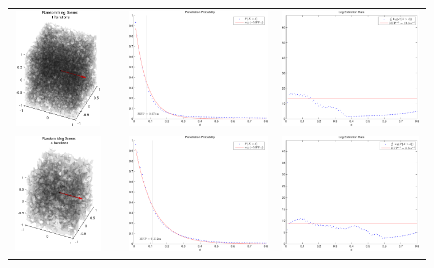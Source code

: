 \begin{figure}
\centering
\begin{tabular}{cccc}
\includegraphics[height=1.2in]{Penetration/ising_cell_001.png} &&
\includegraphics[height=1.2in]{Penetration/ising_penetration_001} &
\includegraphics[height=1.2in]{Penetration/ising_extinction_001}\\
\includegraphics[height=1.2in]{Penetration/ising_cell_004.png} &&
\includegraphics[height=1.2in]{Penetration/ising_penetration_004} &
\includegraphics[height=1.2in]{Penetration/ising_extinction_004}\\

\end{tabular}
\end{figure}
